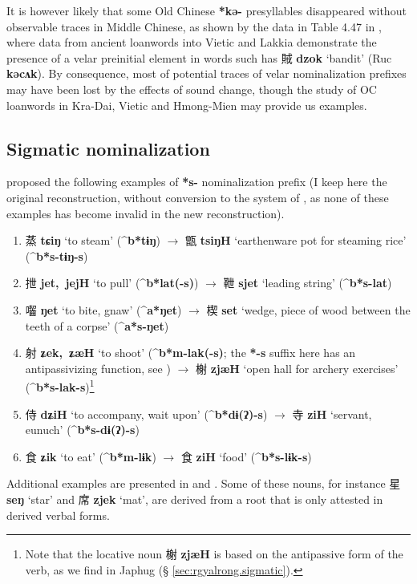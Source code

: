 \documentclass[oneside,a4paper,11pt]{article}
\newcommand{\ipa}[1]{\textbf{{\phon\mbox{#1}}}} %
\newcommand{\zh}[1]{{\cn #1}}
\newcommand{\zhc}[2]{\zh{#1} \ipa{#2}}
\begin{document}
It is however likely that some Old Chinese \ipa{*kə-} presyllables disappeared without observable traces in Middle Chinese, as shown by the data in Table 4.47 in \citet[153]{bs14oc}, where data from ancient loanwords into Vietic and Lakkia demonstrate the presence of a velar preinitial element in words such has \zhc{賊}{dzok} `bandit' (Ruc \ipa{kəcʌk}). By consequence, most of potential traces of velar nominalization prefixes may have been lost by the effects of sound change, though the study of OC loanwords in Kra-Dai, Vietic and Hmong-Mien may provide us examples.

\subsection{Sigmatic nominalization}
\citet[73]{sagart99roc} proposed the following examples of \ipa{*s-} nominalization prefix (I keep here the original reconstruction, without conversion to the system of \citealt{bs14oc}, as none of these examples has become invalid in the new reconstruction).

\begin{enumerate}
\item \zhc{蒸}{tɕiŋ} `to steam' (\ipa{^b*tɨŋ}) $\rightarrow$ \zhc{甑}{tsiŋH} `earthenware pot for steaming rice' (\ipa{^b*s-tɨŋ-s})
\item \zhc{抴}{jet, jejH} `to pull' (\ipa{^b*lat(-s)}) $\rightarrow$ \zhc{靾}{sjet} `leading string' (\ipa{^b*s-lat})
\item \zhc{囓}{ŋet} `to bite, gnaw' (\ipa{^a*ŋet}) $\rightarrow$ \zhc{楔}{set} `wedge, piece of wood between the teeth of a corpse' (\ipa{^a*s-ŋet})
\item \zhc{射}{ʑek, ʑæH} `to shoot' (\ipa{^b*m-lak(-s)}; the \ipa{*-s} suffix here has an antipassivizing function, see \citealt{jacques18antipass}) $\rightarrow$ \zhc{榭}{zjæH} `open hall for archery exercises' (\ipa{^b*s-lak-s})\footnote{
Note that the locative noun \zhc{榭}{zjæH} is based on the antipassive form of the verb, as we find in Japhug (§ \ref{sec:rgyalrong.sigmatic}). }
\item \zhc{侍}{dʑiH} `to accompany, wait upon' (\ipa{^b*dɨ(ʔ)-s}) $\rightarrow$ \zhc{寺}{ziH} `servant, eunuch' (\ipa{^b*s-dɨ(ʔ)-s})
\item \zhc{食}{ʑik} `to eat' (\ipa{^b*m-lɨk}) $\rightarrow$ \zhc{食}{ziH} `food' (\ipa{^b*s-lɨk-s})
\end{enumerate}

Additional examples are presented in \citet[56]{bs14oc} and \citealt{sagart12sprefix}. Some of these nouns, for instance \zhc{星}{seŋ} `star’ and \zhc{席}{zjek} `mat’, are derived from a root that is only attested in derived verbal forms.
\end{document}
